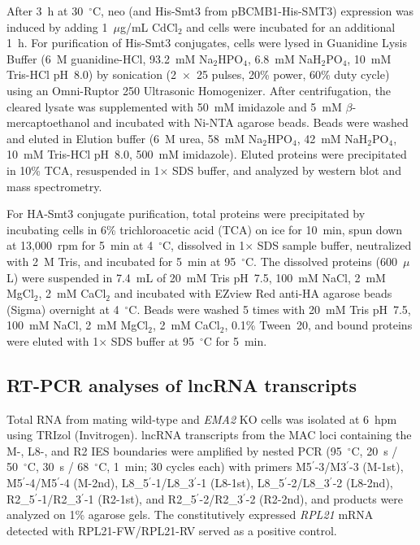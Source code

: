 \documentclass[11pt,a4paper]{article}
\begin{document}
After 3~h at 30~$^\circ$C, neo (and His-Smt3 from pBCMB1-His-SMT3) expression was induced by adding 1~$\mu$g/mL CdCl$_2$ and cells were incubated for an additional 1~h. For purification of His-Smt3 conjugates, cells were lysed in Guanidine Lysis Buffer (6~M guanidine-HCl, 93.2~mM Na$_2$HPO$_4$, 6.8~mM NaH$_2$PO$_4$, 10~mM Tris-HCl pH~8.0) by sonication (2~$\times$~25 pulses, 20\% power, 60\% duty cycle) using an Omni-Ruptor 250 Ultrasonic Homogenizer. After centrifugation, the cleared lysate was supplemented with 50~mM imidazole and 5~mM $\beta$-mercaptoethanol and incubated with Ni-NTA agarose beads. Beads were washed and eluted in Elution buffer (6~M urea, 58~mM Na$_2$HPO$_4$, 42~mM NaH$_2$PO$_4$, 10~mM Tris-HCl pH~8.0, 500~mM imidazole). Eluted proteins were precipitated in 10\% TCA, resuspended in 1$\times$ SDS buffer, and analyzed by western blot and mass spectrometry.

For HA-Smt3 conjugate purification, total proteins were precipitated by incubating cells in 6\% trichloroacetic acid (TCA) on ice for 10~min, spun down at 13{,}000~rpm for 5~min at 4~$^\circ$C, dissolved in 1$\times$ SDS sample buffer, neutralized with 2~M Tris, and incubated for 5~min at 95~$^\circ$C. The dissolved proteins (600~$\mu$L) were suspended in 7.4~mL of 20~mM Tris pH~7.5, 100~mM NaCl, 2~mM MgCl$_2$, 2~mM CaCl$_2$ and incubated with EZview Red anti-HA agarose beads (Sigma) overnight at 4~$^\circ$C. Beads were washed 5 times with 20~mM Tris pH~7.5, 100~mM NaCl, 2~mM MgCl$_2$, 2~mM CaCl$_2$, 0.1\% Tween~20, and bound proteins were eluted with 1$\times$ SDS buffer at 95~$^\circ$C for 5~min.

\subsection{RT-PCR analyses of lncRNA transcripts}
Total RNA from mating wild-type and \textit{EMA2} KO cells was isolated at 6~hpm using TRIzol (Invitrogen). lncRNA transcripts from the MAC loci containing the M-, L8-, and R2 IES boundaries were amplified by nested PCR (95~$^\circ$C, 20~s / 50~$^\circ$C, 30~s / 68~$^\circ$C, 1~min; 30 cycles each) with primers M5$^\prime$-3/M3$^\prime$-3 (M-1st), M5$^\prime$-4/M5$^\prime$-4 (M-2nd), L8\_5$^\prime$-1/L8\_3$^\prime$-1 (L8-1st), L8\_5$^\prime$-2/L8\_3$^\prime$-2 (L8-2nd), R2\_5$^\prime$-1/R2\_3$^\prime$-1 (R2-1st), and R2\_5$^\prime$-2/R2\_3$^\prime$-2 (R2-2nd), and products were analyzed on 1\% agarose gels. The constitutively expressed \textit{RPL21} mRNA detected with RPL21-FW/RPL21-RV served as a positive control.
\end{document}
